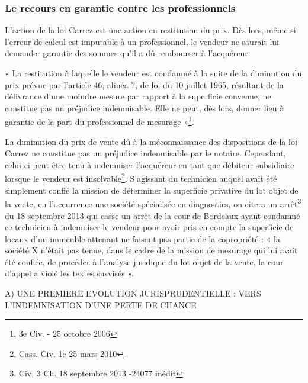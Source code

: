 		\subsubsection{Le recours en garantie contre les professionnels}
			
			L’action de la loi Carrez est une action en restitution du prix. Dès lors, même si l’erreur de calcul est
			imputable à un professionnel, le vendeur ne saurait lui demander garantie des sommes qu’il a dû
			rembourser à l’acquéreur.
			
			« La restitution à laquelle le vendeur est condamné à la suite de la diminution du prix prévue par l’article
			46, alinéa 7, de loi du 10 juillet 1965, résultant de la délivrance d’une moindre mesure par rapport à la
			superficie convenue, ne constitue pas un préjudice indemnisable. Elle ne peut, dès lors, donner lieu à
			garantie de la part du professionnel de mesurage »\footnote{3e Civ. - 25 octobre 2006}.
			
			La diminution du prix de vente dû à la méconnaissance des dispositions de la loi Carrez ne constitue pas
			un préjudice indemnisable par le notaire.
			Cependant, celui-ci peut être tenu à indemniser l’acquéreur en tant que débiteur subsidiaire lorsque le
			vendeur est insolvable\footnote{Cass. Civ. 1e 25 mars 2010}.
			S’agissant du technicien auquel avait été simplement confié la mission de déterminer la superficie privative
			du lot objet de la vente, en l’occurrence une société spécialisée en diagnostics, on citera un arrêt\footnote{Civ. 3\ieme{} Ch. 18 septembre 2013 -24077 inédit} du 18 septembre 2013 qui casse un arrêt de la cour de Bordeaux ayant condamné ce technicien à indemniser le
			vendeur pour avoir pris en compte la superficie de locaux d'un immeuble attenant ne faisant pas partie de
			la copropriété : « la société X n'était pas tenue, dans le cadre de la mission de mesurage qui lui avait été
			confiée, de procéder à l'analyse juridique du lot objet de la vente, la cour d'appel a violé les textes
			susvisés ».
			
			A) UNE PREMIERE EVOLUTION JURISPRUDENTIELLE : VERS L’INDEMNISATION D’UNE PERTE DE	CHANCE
			
